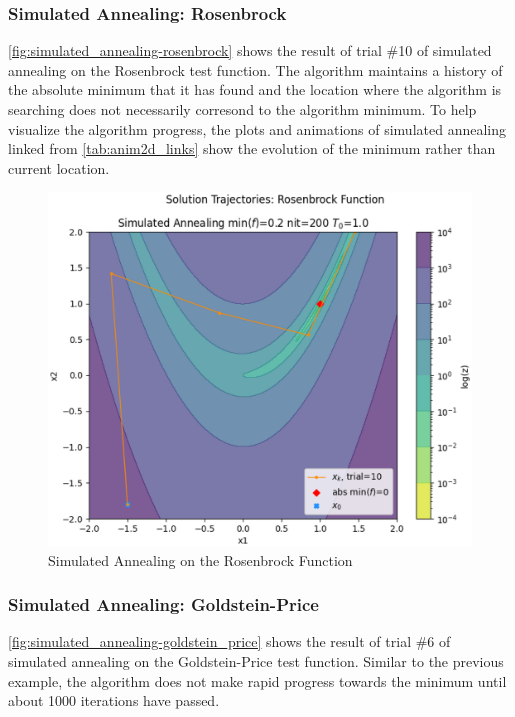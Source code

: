 \documentclass{vgtc}                          %
\begin{document}
\subsubsection{Simulated Annealing: Rosenbrock}

\autoref{fig:simulated_annealing-rosenbrock} shows the result of trial \#10 of simulated annealing on the Rosenbrock test function. The algorithm maintains a history of the absolute minimum that it has found and the location where the algorithm is searching does not necessarily corresond to the algorithm minimum. To help visualize the algorithm progress, the plots and animations of simulated annealing linked from \autoref{tab:anim2d_links} show the evolution of the minimum rather than current location.

\begin{figure}[tb]
\centering
\includegraphics[width=\columnwidth]{figures/pictures/images/simulated_annealing-rosenbrock-plot2d-10.eps}
\caption{Simulated Annealing on the Rosenbrock Function}
\label{fig:simulated_annealing-rosenbrock}
\end{figure}

\subsubsection{Simulated Annealing: Goldstein-Price}

\autoref{fig:simulated_annealing-goldstein_price} shows the result of trial \#6 of simulated annealing on the Goldstein-Price test function. Similar to the previous example, the algorithm does not make rapid progress towards the minimum until about 1000 iterations have passed.
\end{document}
